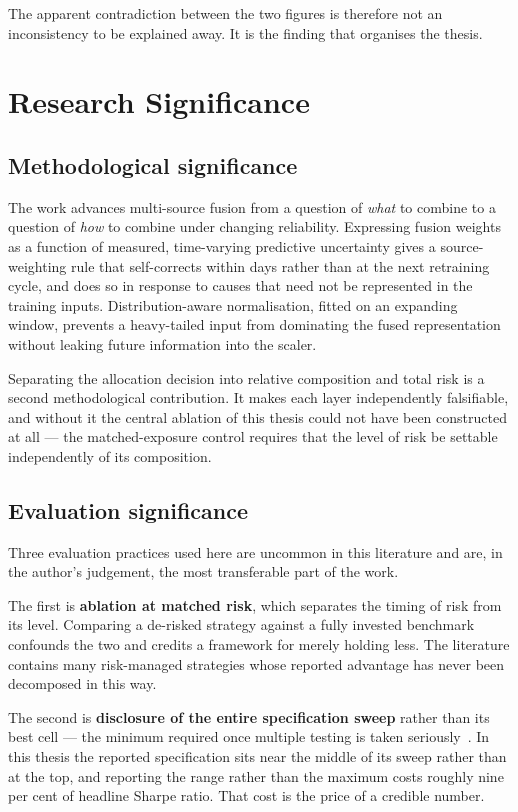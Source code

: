The apparent contradiction between the two figures is therefore not an inconsistency to be
explained away. It is the finding that organises the thesis.

\section{Research Significance}
\label{sec:concl-signif}

\subsection{Methodological significance}

The work advances multi-source fusion from a question of \emph{what} to combine to a question of
\emph{how} to combine under changing reliability. Expressing fusion weights as a function of
measured, time-varying predictive uncertainty gives a source-weighting rule that self-corrects
within days rather than at the next retraining cycle, and does so in response to causes that need
not be represented in the training inputs. Distribution-aware normalisation, fitted on an expanding
window, prevents a heavy-tailed input from dominating the fused representation without leaking
future information into the scaler.

Separating the allocation decision into relative composition and total risk is a second
methodological contribution. It makes each layer independently falsifiable, and without it the
central ablation of this thesis could not have been constructed at all --- the matched-exposure
control requires that the level of risk be settable independently of its composition.

\subsection{Evaluation significance}

Three evaluation practices used here are uncommon in this literature and are, in the author's
judgement, the most transferable part of the work.

The first is \textbf{ablation at matched risk}, which separates the timing of risk from its level.
Comparing a de-risked strategy against a fully invested benchmark confounds the two and credits a
framework for merely holding less. The literature contains many risk-managed strategies whose
reported advantage has never been decomposed in this way.

The second is \textbf{disclosure of the entire specification sweep} rather than its best cell ---
the minimum required once multiple testing is taken seriously~\cite{harvey2015,bailey2014dsr,
valls2026}. In this thesis the reported specification sits near the middle of its sweep rather than
at the top, and reporting the range rather than the maximum costs roughly nine per cent of headline
Sharpe ratio. That cost is the price of a credible number.

